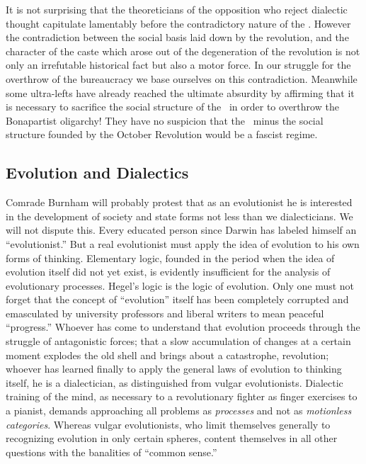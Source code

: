 It is not surprising that the theoreticians of the opposition who reject dialectic thought capitulate lamentably before the contradictory nature of the \USSR. However the contradiction between the social basis laid down by the revolution, and the character of the caste which arose out of the degeneration of the revolution is not only an irrefutable historical fact but also a motor force. In our struggle for the overthrow of the bureaucracy we base ourselves on this contradiction. Meanwhile some ultra-lefts have already reached the ultimate absurdity by affirming that it is necessary to sacrifice the social structure of the \USSR\ in order to overthrow the Bonapartist oligarchy! They have no suspicion that the \USSR\ minus the social structure founded by the October Revolution would be a fascist regime.

\subsection*{Evolution and Dialectics}

Comrade Burnham will probably protest that as an evolutionist he is interested in the development of society and state forms not less than we dialecticians. We will not dispute this. Every educated person since Darwin has labeled himself an “evolutionist.” But a real evolutionist must apply the idea of evolution to his own forms of thinking. Elementary logic, founded in the period when the idea of evolution itself did not yet exist, is evidently insufficient for the analysis of evolutionary processes. Hegel’s logic is the logic of evolution. Only one must not forget that the concept of “evolution” itself has been completely corrupted and emasculated by university professors and liberal writers to mean peaceful “progress.” Whoever has come to understand that evolution proceeds through the struggle of antagonistic forces; that a slow accumulation of changes at a certain moment explodes the old shell and brings about a catastrophe, revolution; whoever has learned finally to apply the general laws of evolution to thinking itself, he is a dialectician, as distinguished from vulgar evolutionists. Dialectic training of the mind, as necessary to a revolutionary fighter as finger exercises to a pianist, demands approaching all problems as \emph{processes} and not as \emph{motionless categories}. Whereas vulgar evolutionists, who limit themselves generally to recognizing evolution in only certain spheres, content themselves in all other questions with the banalities of “common sense.”

